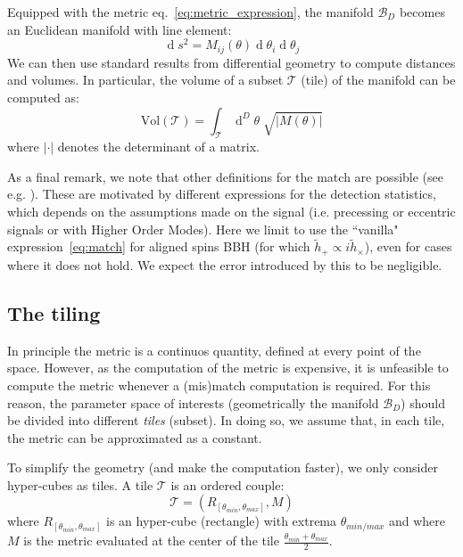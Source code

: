 \documentclass[twocolumn,showpacs,preprintnumbers,nofootinbib,prd,
superscriptaddress,10pt]{revtex4-2}
\renewcommand{\d}[1]{\ensuremath{\operatorname{d}\!{#1}}}
\newcommand{\dvol}[2]{\ensuremath{\operatorname{d}^{#2}\!{#1}}}
\begin{document}
Equipped with the metric eq.~\eqref{eq:metric_expression}, the manifold $\mathcal{B}_D$ becomes an Euclidean manifold with line element:
\begin{equation}\label{eq:line_element}
	\d{s^2} = M_{ij}(\theta) \d{\theta_i} \d{\theta_j}
\end{equation}
We can then use standard results from differential geometry to compute distances and volumes. In particular, the volume of a subset $\mathcal{T}$ (tile) of the manifold can be computed as:
\begin{equation}\label{eq:volume_tile}
	\text{Vol}(\mathcal{T}) = \int_\mathcal{T} \dvol{\theta}{D} \; \sqrt{|M(\theta)|}
\end{equation}
where $|\cdot|$ denotes the determinant of a matrix.

As a final remark, we note that other definitions for the match are possible (see e.g. \cite{sky_maxed,symphony}). These are motivated by different expressions for the detection statistics, which depends on the assumptions made on the signal (i.e. precessing or eccentric signals or with Higher Order Modes). Here we limit to use the ``vanilla" expression~\eqref{eq:match} for aligned spins BBH (for which $\tilde{h}_+ \propto i \tilde{h}_\times$), even for cases where it does not hold. We expect the error introduced by this to be negligible.

\subsection{The tiling} \label{sec:tiling}

In principle the metric is a continuos quantity, defined at every point of the space. However, as the computation of the metric is expensive, it is unfeasible to compute the metric whenever a (mis)match computation is required.
For this reason, the parameter space of interests (geometrically the manifold $\mathcal{B}_D$) should be divided into different {\it tiles} (subset). In doing so, we assume that, in each tile, the metric can be approximated as a constant.

To simplify the geometry (and make the computation faster), we only consider hyper-cubes as tiles. A tile $\mathcal{T}$ is an ordered couple:
\begin{equation} \label{eq:tile}
	\mathcal{T} = \left(R_{[\theta_{min}, \theta_{max}]}, M \right)
\end{equation}
where $R_{[\theta_{min}, \theta_{max}]}$ is an hyper-cube (rectangle) with extrema $\theta_{min/max}$ and where $M$ is the metric evaluated at the center of the tile $\frac{\theta_{min}+\theta_{max}}{2}$.
\end{document}
